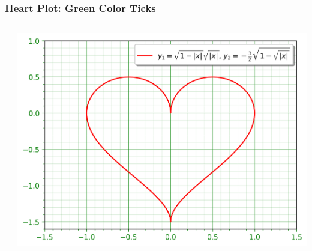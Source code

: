 \documentclass[xcolor={svgnames}]{beamer}
\newcommand{\pyfile}[2][]{}
\begin{document}
\begin{frame}[t,fragile]
    \frametitle{Heart Plot: Green Color Ticks}
    \vspace{-2mm}
    \begin{columns}[T]
        \begin{column}{0.47\textwidth}
            \pyfile[style=tiny,linerange=30]{examples/heart-4.py}
        \end{column}
        \begin{column}{0.53\textwidth}
            \includegraphics[width=\textwidth]{img/heart-4.png}
        \end{column}
    \end{columns}
\end{frame}
\end{document}
